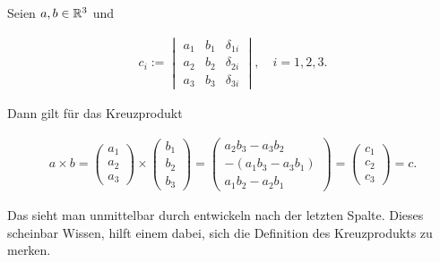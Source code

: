 \begin{remark*}

Seien $a, b \in \mathbb{R}^3$ und

\begin{align*}
  c_i
  :=
  \begin{vmatrix}
    a_1 & b_1 & \delta_{1 i} \\
    a_2 & b_2 & \delta_{2 i} \\
    a_3 & b_3 & \delta_{3 i}
  \end{vmatrix},
  \quad
  i = 1, 2, 3.
\end{align*}

Dann gilt für das Kreuzprodukt

\begin{align*}
  a \times b
  =
  \begin{pmatrix}
    a_1 \\
    a_2 \\
    a_3
  \end{pmatrix}
  \times
  \begin{pmatrix}
  b_1 \\
  b_2 \\
  b_3
  \end{pmatrix}
  =
  \begin{pmatrix}
      a_2 b_3 - a_3 b_2 \\
    -(a_1 b_3 - a_3 b_1) \\
      a_1 b_2 - a_2 b_1
  \end{pmatrix}
  =
  \begin{pmatrix}
    c_1 \\
    c_2 \\
    c_3
  \end{pmatrix}
  = c.
\end{align*}

Das sieht man unmittelbar durch entwickeln nach der letzten Spalte.
Dieses scheinbar  Wissen, hilft einem dabei, sich die Definition des Kreuzprodukts zu merken.

\end{remark*}
